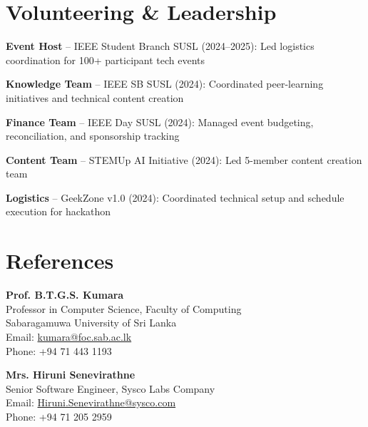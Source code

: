 \documentclass[letterpaper,10.8pt]{article}
\newenvironment{resume_list}{
  \vspace{-1pt}
  \begin{itemize}[itemsep=2pt, leftmargin=14pt]
}{
  \end{itemize}\vspace{-2pt}
}
\begin{document}
\section{Volunteering \& Leadership}
\vspace{-1pt}
\begin{resume_list}
  \item \textbf{Event Host} – IEEE Student Branch SUSL (2024–2025): Led logistics coordination for 100+ participant tech events
  \vspace{3pt}
  \item \textbf{Knowledge Team} – IEEE SB SUSL (2024): Coordinated peer-learning initiatives and technical content creation
  \vspace{3pt}
  \item \textbf{Finance Team} – IEEE Day SUSL (2024): Managed event budgeting, reconciliation, and sponsorship tracking
  \vspace{3pt}
  \item \textbf{Content Team} – STEMUp AI Initiative (2024): Led 5-member content creation team
  \vspace{3pt}
  \item \textbf{Logistics} – GeekZone v1.0 (2024): Coordinated technical setup and schedule execution for hackathon
\end{resume_list}

\vspace{-2pt}
\section{References}
\vspace{-1pt}

\noindent\textbf{Prof. B.T.G.S. Kumara}\\
Professor in Computer Science, Faculty of Computing\\
Sabaragamuwa University of Sri Lanka\\
Email: \href{mailto:kumara@foc.sab.ac.lk}{kumara@foc.sab.ac.lk}\\
Phone: +94 71 443 1193

\vspace{6pt}

\noindent\textbf{Mrs. Hiruni Senevirathne}\\
Senior Software Engineer, Sysco Labs Company\\
Email: \href{mailto:Hiruni.Senevirathne@sysco.com}{Hiruni.Senevirathne@sysco.com}\\
Phone: +94 71 205 2959
\end{document}
